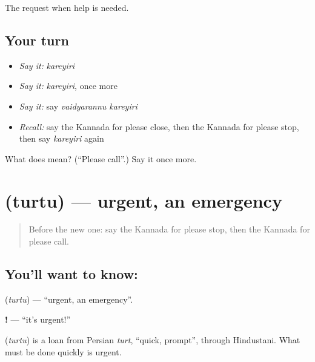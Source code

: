 \begin{grammarlens}[title={What you've built}]
The request when help is needed.
\end{grammarlens}

\subsection*{Your turn}
\begin{itemize}
\raggedright
  \item \emph{Say it:} \emph{kareyiri}
  \item \emph{Say it:} \emph{kareyiri}, once more
  \item \emph{Say it:} say \emph{vaidyarannu kareyiri}
  \item \emph{Recall:} say the Kannada for please close, then the Kannada for please stop, then say \emph{kareyiri} again
\end{itemize}

\begin{tcolorbox}[breakable,colback=teal!4,colframe=teal!35!black,title={Before you move on}]
What does  mean? (\textquotedblleft{}Please call\textquotedblright{}.) Say it once more.
\end{tcolorbox}
\section[\texorpdfstring{\kn{ತುರ್ತು} (turtu)}{ತುರ್ತು (turtu)}]{ (turtu) — urgent, an emergency}

\label{lesson:KA-C101-urgent}



\begin{quote}
Before the new one: say the Kannada for please stop, then the Kannada for please call.
\end{quote}

\subsection*{You'll want to know: }
\textbf{} (\emph{turtu}) — \textquotedblleft{}urgent, an emergency\textquotedblright{}.

\textbf{!} — \textquotedblleft{}it's urgent!\textquotedblright{}

\begin{cousinweb}
\textbf{} (\emph{turtu}) is a loan from Persian \emph{turt}, \textquotedblleft{}quick, prompt\textquotedblright{}, through Hindustani. What must be done quickly is urgent.
\end{cousinweb}

